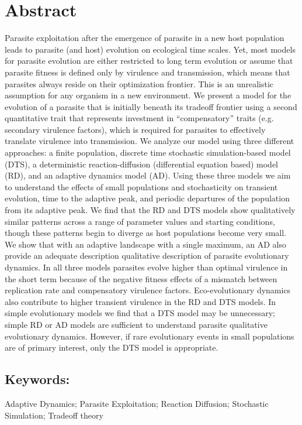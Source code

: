 \section*{Abstract}

Parasite exploitation after the emergence of parasite in a new host population leads to parasite (and host) evolution on ecological time scales. Yet, most models for parasite evolution are either restricted to long term evolution or assume that parasite fitness is defined only by virulence and transmission, which means that parasites always reside on their optimization frontier. This is an unrealistic assumption for any organism in a new environment. We present a model for the evolution of a parasite that is initially beneath its tradeoff frontier using a second quantitative trait that represents investment in ``compensatory'' traits (e.g. secondary virulence factors), which is required for parasites to effectively translate virulence into transmission. We analyze our model using three different approaches: a finite population, discrete time stochastic simulation-based model (DTS), a deterministic reaction-diffusion (differential equation based) model (RD), and an adaptive dynamics model (AD). Using these three models we aim to understand the effects of small populations and stochasticity on transient evolution, time to the adaptive peak, and periodic departures of the population from its adaptive peak. We find that the RD and DTS models show qualitatively similar patterns across a range of parameter values and starting conditions, though these patterns begin to diverge as host populations become very small. We show that with an adaptive landscape with a single maximum, an AD also provide an adequate description qualitative description of parasite evolutionary dynamics. In all three models parasites evolve higher than optimal virulence in the short term because of the negative fitness effects of a mismatch between replication rate and compensatory virulence factors. Eco-evolutionary dynamics also contribute to higher transient virulence in the RD and DTS models. In simple evolutionary models we find that a DTS model may be unnecessary; simple RD or AD models are sufficient to understand parasite qualitative evolutionary dynamics. However, if rare evolutionary events in small populations are of primary interest, only the DTS model is appropriate. 

\subsection*{Keywords:}
Adaptive Dynamics; Parasite Exploitation; Reaction Diffusion; Stochastic Simulation; Tradeoff theory 

